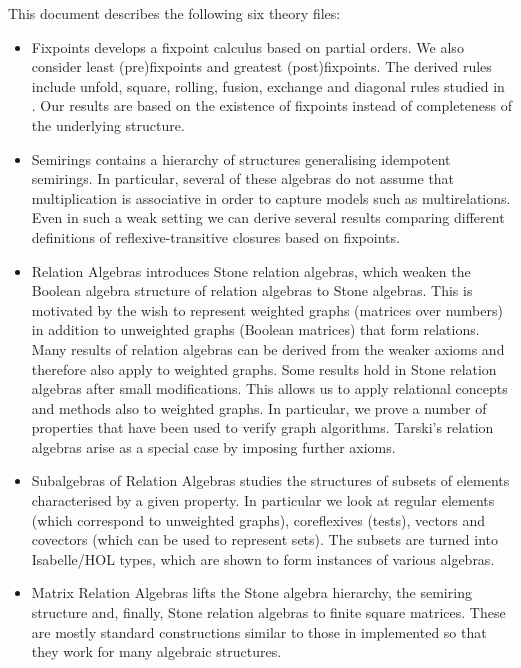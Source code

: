 \documentclass[11pt,a4paper]{article}
\begin{document}
This document describes the following six theory files:
\begin{itemize}
\item Fixpoints develops a fixpoint calculus based on partial orders.
      We also consider least (pre)fixpoints and greatest (post)fixpoints.
      The derived rules include unfold, square, rolling, fusion, exchange and diagonal rules studied in \cite{AartsBackhouseBoitenDoornbosGasterenGeldropHoogendijkVoermansWoude1995}.
      Our results are based on the existence of fixpoints instead of completeness of the underlying structure.
\item Semirings contains a hierarchy of structures generalising idempotent semirings.
      In particular, several of these algebras do not assume that multiplication is associative in order to capture models such as multirelations.
      Even in such a weak setting we can derive several results comparing different definitions of reflexive-transitive closures based on fixpoints.
\item Relation Algebras introduces Stone relation algebras, which weaken the Boolean algebra structure of relation algebras to Stone algebras.
      This is motivated by the wish to represent weighted graphs (matrices over numbers) in addition to unweighted graphs (Boolean matrices) that form relations.
      Many results of relation algebras can be derived from the weaker axioms and therefore also apply to weighted graphs.
      Some results hold in Stone relation algebras after small modifications.
      This allows us to apply relational concepts and methods also to weighted graphs.
      In particular, we prove a number of properties that have been used to verify graph algorithms.
      Tarski's relation algebras \cite{Tarski1941} arise as a special case by imposing further axioms.
\item Subalgebras of Relation Algebras studies the structures of subsets of elements characterised by a given property.
      In particular we look at regular elements (which correspond to unweighted graphs), coreflexives (tests), vectors and covectors (which can be used to represent sets).
      The subsets are turned into Isabelle/HOL types, which are shown to form instances of various algebras.
\item Matrix Relation Algebras lifts the Stone algebra hierarchy, the semiring structure and, finally, Stone relation algebras to finite square matrices.
      These are mostly standard constructions similar to those in \cite{ArmstrongFosterStruthWeber2016,ArmstrongGomesStruthWeber2016} implemented so that they work for many algebraic structures.

\end{itemize}
\end{document}
